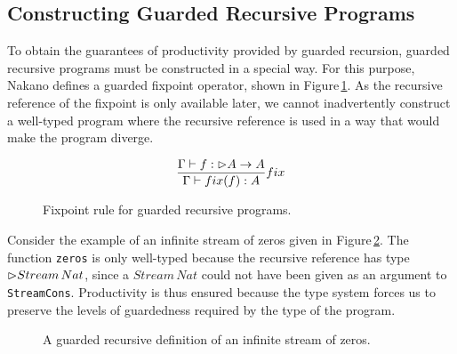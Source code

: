 
\subsection{Constructing Guarded Recursive Programs}
\label{sec:constr-guard-recurs}
To obtain the guarantees of productivity provided by guarded recursion, guarded recursive programs must be constructed in a special way. For this purpose, Nakano defines a guarded fixpoint operator, shown in Figure\,\ref{fig:guarded_recursion_fixpoint}. As the recursive reference of the fixpoint is only available later, we cannot inadvertently construct a well-typed program where the recursive reference is used in a way that would make the program diverge.
\begin{figure}
\[
\frac { \Gamma \vdash f : \rhd A \rightarrow A }{ \Gamma \vdash fix(f) : A } fix
\]
\caption{Fixpoint rule for guarded recursive programs.}
\label{fig:guarded_recursion_fixpoint}
\end{figure} 
Consider the example of an infinite stream of zeros given in Figure\,\ref{fig:guarded_recursion_zeros}. The function \texttt{zeros} is only well-typed because the recursive reference has type $\rhd Stream\,Nat$, since a $Stream\,Nat$ could not have been given as an argument to \texttt{StreamCons}. Productivity is thus ensured because the type system forces us to preserve the levels of guardedness required by the type of the program.
\begin{figure}

\caption{A guarded recursive definition of an infinite stream of zeros.}
\label{fig:guarded_recursion_zeros}
\end{figure}

